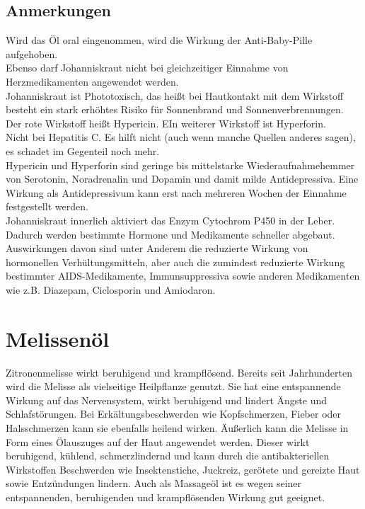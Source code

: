 \subsection{Anmerkungen}

Wird das Öl oral eingenommen, wird die Wirkung der Anti-Baby-Pille aufgehoben.\\
Ebenso darf Johanniskraut nicht bei gleichzeitiger Einnahme von Herzmedikamenten angewendet werden.\\ 
Johanniskraut ist Phototoxisch, das heißt bei Hautkontakt mit dem Wirkstoff besteht ein stark erhöhtes Risiko für Sonnenbrand und Sonnenverbrennungen.\\
Der rote Wirkstoff heißt Hypericin. EIn weiterer Wirkstoff ist Hyperforin. \\
Nicht bei Hepatitis C. Es hilft nicht (auch wenn manche Quellen anderes sagen), es schadet im Gegenteil noch mehr.\\
Hypericin und Hyperforin sind geringe bis mittelstarke Wiederaufnahmehemmer von Serotonin, Noradrenalin und Dopamin und damit milde Antidepressiva. Eine Wirkung als Antidepressivum kann erst nach mehreren Wochen der Einnahme festgestellt werden.\\
Johanniskraut innerlich aktiviert das Enzym Cytochrom P450 in der Leber. Dadurch werden bestimmte Hormone und Medikamente schneller abgebaut. Auswirkungen davon sind unter Anderem die reduzierte Wirkung von hormonellen Verhültungsmitteln, aber auch die zumindest reduzierte Wirkung bestimmter AIDS-Medikamente, Immunsuppressiva sowie anderen Medikamenten wie z.B. Diazepam, Ciclosporin und Amiodaron.



\newpage




\section{Melissenöl}

Zitronenmelisse wirkt beruhigend und krampflösend. Bereits seit Jahrhunderten wird die Melisse als vielseitige Heilpflanze genutzt. Sie hat eine entspannende Wirkung auf das Nervensystem, wirkt beruhigend und lindert Ängste und Schlafstörungen. Bei Erkältungsbeschwerden wie Kopfschmerzen, Fieber oder Halsschmerzen kann sie ebenfalls heilend wirken. Äußerlich kann die Melisse in Form eines Ölauszuges auf der Haut angewendet werden. Dieser wirkt beruhigend, kühlend, schmerzlindernd und kann durch die antibakteriellen Wirkstoffen Beschwerden wie Insektenstiche, Juckreiz, gerötete und gereizte Haut sowie Entzündungen lindern. Auch als Massageöl ist es wegen seiner entspannenden, beruhigenden und krampflösenden Wirkung gut geeignet.


